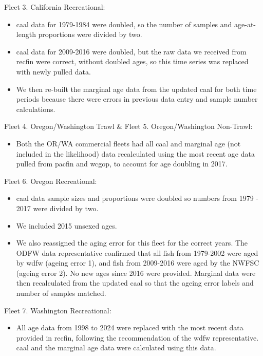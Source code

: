 \documentclass[
]{scrartcl}
\providecommand{\tightlist}{%
  \setlength{\itemsep}{0pt}\setlength{\parskip}{0pt}}\usepackage{longtable,booktabs,array}
\begin{document}
Fleet 3. California Recreational:

\begin{itemize}
\tightlist
\item
  \gls{caal} data for 1979-1984 were doubled, so the number of samples
  and age-at-length proportions were divided by two.
\item
  \gls{caal} data for 2009-2016 were doubled, but the raw data we
  received from \gls{recfin} were correct, without doubled ages, so this
  time series was replaced with newly pulled data.
\item
  We then re-built the marginal age data from the updated \gls{caal} for
  both time periods because there were errors in previous data entry and
  sample number calculations.
\end{itemize}

Fleet 4. Oregon/Washington Trawl \& Fleet 5. Oregon/Washington
Non-Trawl:

\begin{itemize}
\tightlist
\item
  Both the OR/WA commercial fleets had all \gls{caal} and marginal age
  (not included in the likelihood) data recalculated using the most
  recent age data pulled from \gls{pacfin} and \gls{wcgop}, to account
  for age doubling in 2017.
\end{itemize}

Fleet 6. Oregon Recreational:

\begin{itemize}
\tightlist
\item
  \gls{caal} data sample sizes and proportions were doubled so numbers
  from 1979 - 2017 were divided by two.
\item
  We included 2015 unsexed ages.
\item
  We also reassigned the aging error for this fleet for the correct
  years. The ODFW data representative confirmed that all fish from
  1979-2002 were aged by \gls{wdfw} (ageing error 1), and fish from
  2009-2016 were aged by the NWFSC (ageing error 2). No new ages since
  2016 were provided. Marginal data were then recalculated from the
  updated \gls{caal} so that the ageing error labels and number of
  samples matched.
\end{itemize}

Fleet 7. Washington Recreational:

\begin{itemize}
\tightlist
\item
  All age data from 1998 to 2024 were replaced with the most recent data
  provided in \gls{recfin}, following the recommendation of the
  \gls{wdfw} representative. \gls{caal} and the marginal age data were
  calculated using this data.
\end{itemize}
\end{document}

